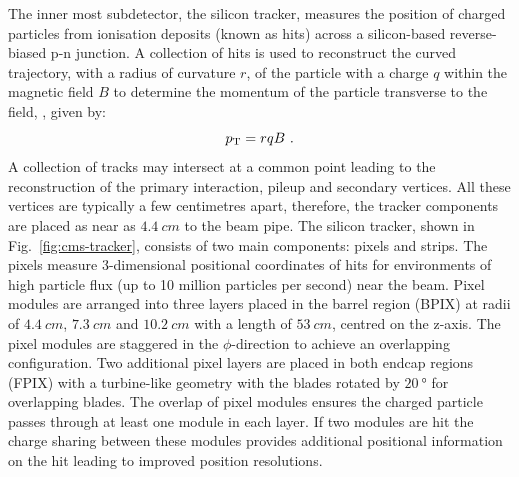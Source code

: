 The inner most subdetector, the silicon tracker, measures the position of charged particles from ionisation deposits (known as hits) across a silicon-based reverse-biased p-n junction. A collection of hits is used to reconstruct the curved trajectory, with a radius of curvature $r$, of the particle with a charge $q$ within the magnetic field $B$ to determine the momentum of the particle transverse to the field, \pt, given by:
%
\begin{equation}
    p_{\text{T}} = rqB\ .
\end{equation}
%
A collection of tracks may intersect at a common point leading to the reconstruction of the primary interaction, pileup and secondary vertices.  All these vertices are typically a few centimetres apart, therefore, the tracker components are placed as near as ${\SI{4.4}{cm}}$ to the beam pipe.  The silicon tracker, shown in Fig.~\ref{fig:cms-tracker}, consists of two main components: pixels and strips. The pixels measure 3-dimensional positional coordinates of hits for environments of high particle flux (up to 10 million particles per second) near the beam. Pixel modules are arranged into three layers placed in the barrel region (BPIX) at radii of ${\SI{4.4}{cm}}$, ${\SI{7.3}{cm}}$ and ${\SI{10.2}{cm}}$ with a length of ${\SI{53}{cm}}$, centred on the z-axis. The pixel modules are staggered in the $\phi$-direction to achieve an overlapping configuration. Two additional pixel layers are placed in both endcap regions (FPIX) with a turbine-like geometry with the blades rotated by ${\SI{20}{\degree}}$ for overlapping blades. The overlap of pixel modules ensures the charged particle passes through at least one module in each layer. If two modules are hit the charge sharing between these modules provides additional positional information on the hit leading to improved position resolutions.

